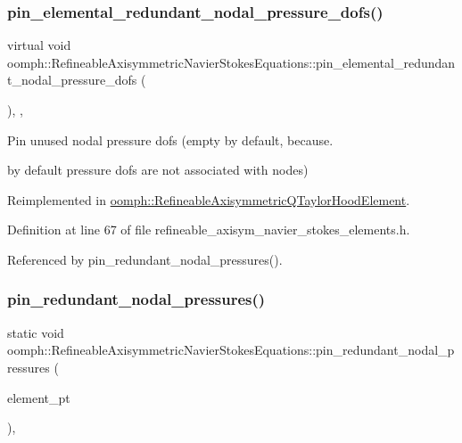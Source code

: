 \subsubsection{\texorpdfstring{pin\+\_\+elemental\+\_\+redundant\+\_\+nodal\+\_\+pressure\+\_\+dofs()}{pin\_elemental\_redundant\_nodal\_pressure\_dofs()}}
{\footnotesize\ttfamily virtual void oomph\+::\+Refineable\+Axisymmetric\+Navier\+Stokes\+Equations\+::pin\+\_\+elemental\+\_\+redundant\+\_\+nodal\+\_\+pressure\+\_\+dofs (\begin{DoxyParamCaption}{ }\end{DoxyParamCaption})\hspace{0.3cm}{\ttfamily [inline]}, {\ttfamily [protected]}, {\ttfamily [virtual]}}



Pin unused nodal pressure dofs (empty by default, because. 

by default pressure dofs are not associated with nodes) 

Reimplemented in \hyperlink{classoomph_1_1RefineableAxisymmetricQTaylorHoodElement_a14e45b922f221125dcfccae8817e1534}{oomph\+::\+Refineable\+Axisymmetric\+Q\+Taylor\+Hood\+Element}.



Definition at line 67 of file refineable\+\_\+axisym\+\_\+navier\+\_\+stokes\+\_\+elements.\+h.



Referenced by pin\+\_\+redundant\+\_\+nodal\+\_\+pressures().

\mbox{\label{classoomph_1_1RefineableAxisymmetricNavierStokesEquations_a76f898cf41bd91d9d9446f646b47c995}} 
\subsubsection{\texorpdfstring{pin\+\_\+redundant\+\_\+nodal\+\_\+pressures()}{pin\_redundant\_nodal\_pressures()}}
{\footnotesize\ttfamily static void oomph\+::\+Refineable\+Axisymmetric\+Navier\+Stokes\+Equations\+::pin\+\_\+redundant\+\_\+nodal\+\_\+pressures (\begin{DoxyParamCaption}\item[{const \hyperlink{classoomph_1_1Vector}{Vector}$<$ \hyperlink{classoomph_1_1GeneralisedElement}{Generalised\+Element} $\ast$$>$ \&}]{element\+\_\+pt }\end{DoxyParamCaption})\hspace{0.3cm}{\ttfamily [inline]}, {\ttfamily [static]}}



